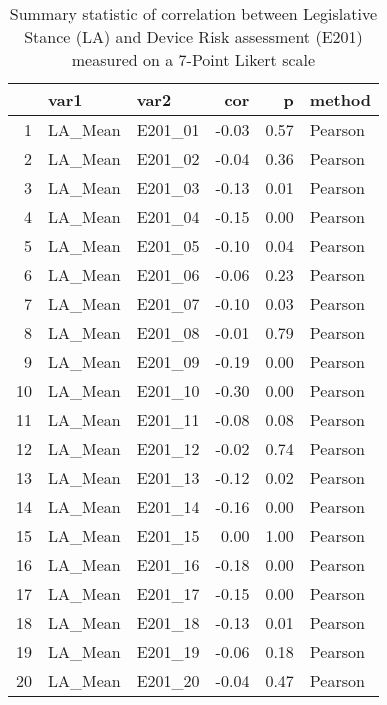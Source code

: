 \begin{table}[ht]
\centering
\begin{tabular}{rllrrl}
  \hline
 & var1 & var2 & cor & p & method \\ 
  \hline
1 & LA\_Mean & E201\_01 & -0.03 & 0.57 & Pearson \\ 
  2 & LA\_Mean & E201\_02 & -0.04 & 0.36 & Pearson \\ 
  3 & LA\_Mean & E201\_03 & -0.13 & 0.01 & Pearson \\ 
  4 & LA\_Mean & E201\_04 & -0.15 & 0.00 & Pearson \\ 
  5 & LA\_Mean & E201\_05 & -0.10 & 0.04 & Pearson \\ 
  6 & LA\_Mean & E201\_06 & -0.06 & 0.23 & Pearson \\ 
  7 & LA\_Mean & E201\_07 & -0.10 & 0.03 & Pearson \\ 
  8 & LA\_Mean & E201\_08 & -0.01 & 0.79 & Pearson \\ 
  9 & LA\_Mean & E201\_09 & -0.19 & 0.00 & Pearson \\ 
  10 & LA\_Mean & E201\_10 & -0.30 & 0.00 & Pearson \\ 
  11 & LA\_Mean & E201\_11 & -0.08 & 0.08 & Pearson \\ 
  12 & LA\_Mean & E201\_12 & -0.02 & 0.74 & Pearson \\ 
  13 & LA\_Mean & E201\_13 & -0.12 & 0.02 & Pearson \\ 
  14 & LA\_Mean & E201\_14 & -0.16 & 0.00 & Pearson \\ 
  15 & LA\_Mean & E201\_15 & 0.00 & 1.00 & Pearson \\ 
  16 & LA\_Mean & E201\_16 & -0.18 & 0.00 & Pearson \\ 
  17 & LA\_Mean & E201\_17 & -0.15 & 0.00 & Pearson \\ 
  18 & LA\_Mean & E201\_18 & -0.13 & 0.01 & Pearson \\ 
  19 & LA\_Mean & E201\_19 & -0.06 & 0.18 & Pearson \\ 
  20 & LA\_Mean & E201\_20 & -0.04 & 0.47 & Pearson \\ 
   \hline
\end{tabular}
\caption{Summary statistic of correlation between Legislative Stance (LA) and Device Risk assessment (E201) measured on a 7-Point Likert scale} 
\end{table}
